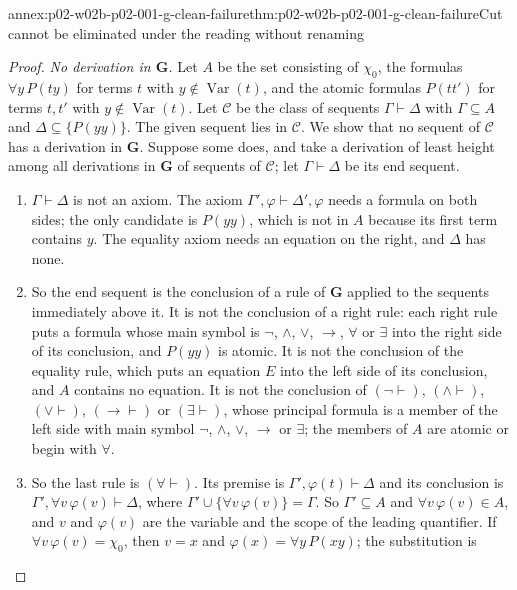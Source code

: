 \begin{annexitem}{annex:p02-w02b-p02-001-g-clean-failure}{thm:p02-w02b-p02-001-g-clean-failure}{Cut cannot be eliminated under the reading without renaming}
\begin{proof}
\emph{No derivation in \(\mathbf G\).}  Let \(A\) be the set consisting of
\(\chi_0\), the formulas \(\forall y\,P(ty)\) for terms \(t\) with
\(y\notin\operatorname{Var}(t)\), and the atomic formulas \(P(tt')\) for
terms \(t,t'\) with \(y\notin\operatorname{Var}(t)\).  Let \(\mathcal C\)
be the class of sequents \(\Gamma\vdash\Delta\) with \(\Gamma\subseteq A\)
and \(\Delta\subseteq\{P(yy)\}\).  The given sequent lies in
\(\mathcal C\).  We show that no sequent of \(\mathcal C\) has a derivation
in \(\mathbf G\).  Suppose some does, and take a derivation of least height
among all derivations in \(\mathbf G\) of sequents of \(\mathcal C\); let
\(\Gamma\vdash\Delta\) be its end sequent.
\begin{enumerate}
\item[(1)] \(\Gamma\vdash\Delta\) is not an axiom.  The axiom
      \(\Gamma',\varphi\vdash\Delta',\varphi\) needs a formula on both
      sides; the only candidate is \(P(yy)\), which is not in \(A\) because
      its first term contains \(y\).  The equality axiom needs an equation
      on the right, and \(\Delta\) has none.
\item[(2)] So the end sequent is the conclusion of a rule of \(\mathbf G\)
      applied to the sequents immediately above it.  It is not the
      conclusion of a right rule: each right rule puts a formula whose main
      symbol is \(\neg\), \(\land\), \(\lor\), \(\to\), \(\forall\) or
      \(\exists\) into the right side of its conclusion, and \(P(yy)\) is
      atomic.  It is not the conclusion of the equality rule, which puts an
      equation \(E\) into the left side of its conclusion, and \(A\)
      contains no equation.  It is not the conclusion of \((\neg\vdash)\),
      \((\land\vdash)\), \((\lor\vdash)\), \((\to\vdash)\) or
      \((\exists\vdash)\), whose principal formula is a member of the left
      side with main symbol \(\neg\), \(\land\), \(\lor\), \(\to\) or
      \(\exists\); the members of \(A\) are atomic or begin with
      \(\forall\).
\item[(3)] So the last rule is \((\forall\vdash)\).  Its premise is
      \(\Gamma',\varphi(t)\vdash\Delta\) and its conclusion is
      \(\Gamma',\forall v\,\varphi(v)\vdash\Delta\), where
      \(\Gamma'\cup\{\forall v\,\varphi(v)\}=\Gamma\).  So
      \(\Gamma'\subseteq A\) and \(\forall v\,\varphi(v)\in A\), and
      \(v\) and \(\varphi(v)\) are the variable and the scope of the
      leading quantifier.  If \(\forall v\,\varphi(v)=\chi_0\), then
      \(v=x\) and \(\varphi(x)=\forall y\,P(xy)\); the substitution is

\end{enumerate}
\end{proof}
\end{annexitem}
